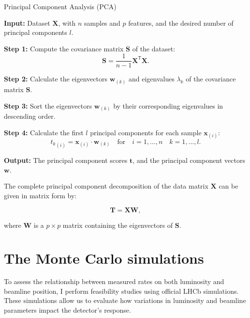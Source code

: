 \begin{algorithm}
\caption{Principal Component Analysis (PCA)}
\begin{algorithmic}[1]
    \STATE \textbf{Input:} Dataset \(\mathbf{X}\), with \(n\) samples and \(p\) features, and the desired number of principal components \(l\).

    \STATE \textbf{Step 1:} Compute the covariance matrix \(\mathbf{S}\) of the dataset:
    \begin{equation*}
    \mathbf{S} = \frac{1}{n - 1} \mathbf{X}^{\mathsf{T}} \mathbf{X}.
    \end{equation*}

    \STATE \textbf{Step 2:} Calculate the eigenvectors \(\mathbf{w}_{(k)}\) and eigenvalues \(\lambda_k\) of the covariance matrix \(\mathbf{S}\).

    \STATE \textbf{Step 3:} Sort the eigenvectors \(\mathbf{w}_{(k)}\) by their corresponding eigenvalues in descending order.

    \STATE \textbf{Step 4:} Calculate the first \(l\) principal components for each sample \(\mathbf{x}_{(i)}\):
    \begin{equation*}
    {t_{k}}_{(i)} = \mathbf{x}_{(i)} \cdot \mathbf{w}_{(k)} \quad \text{for} \quad i = 1, \ldots, n \quad k = 1, \ldots, l.
    \end{equation*}
    
    \STATE \textbf{Output:} The principal component scores \(\mathbf{t}\), and the principal component vectors \(\mathbf{w}\).
\end{algorithmic}
\end{algorithm}


The complete principal component decomposition of the data matrix $\mathbf{X}$ can be given in matrix form by:

\begin{equation}
\mathbf{T} = \mathbf{X} \mathbf{W},
\end{equation}

where $\mathbf{W}$ is a $p \times p$ matrix containing the eigenvectors of $\mathbf{S}$.



\section{The Monte Carlo simulations}\label{sec:MC}
To assess the relationship between measured rates on both luminosity and beamline position, I perform feasibility studies using official LHCb simulations. These simulations allow us to evaluate how variations in luminosity and beamline parameters impact the detector's response.

